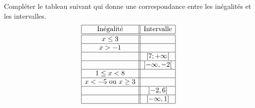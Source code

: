 
\begin{exercice}\label{exosmath-0322}


    Compléter le tableau suivant qui donne une correspondance entre les inégalités et les intervalles.
    \begin{equation*}
        \begin{array}[]{|c||c|}
            \hline
            \text{Inégalité}&\text{Intervalle}\\
            \hline\hline
            x\leq 3&\\
            \hline
            x>-1&\\
            \hline
            &\mathopen[ 7 ; +\infty [\\
            \hline
            &\mathopen] -\infty , -2 \mathclose[\\
            \hline
            1\leq x<8&\\
            \hline
            x<-5\text{ ou }x\geq 3&\\
            \hline
            &\mathopen] -2 , 6 \mathclose]\\
            \hline
            &\mathopen] -\infty , 1 \mathclose]\\
            \hline
        \end{array}
    \end{equation*}

\end{exercice}
